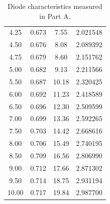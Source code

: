 \documentclass{article}
\begin{document}
\begin{table}[hbtp]
\begin{tabular}{cccc}
    4.25 & 0.673 & 7.55 & 2.021548 \\
    4.50 & 0.676 & 8.08 & 2.089392 \\
    4.75 & 0.679 & 8.60 & 2.151762 \\
    5.00 & 0.682 & 9.13 & 2.211566 \\
    5.50 & 0.687 & 10.18 & 2.320425 \\
    6.00 & 0.692 & 11.23 & 2.418589 \\
    6.50 & 0.696 & 12.30 & 2.509599 \\
    7.00 & 0.699 & 13.36 & 2.592265 \\
    7.50 & 0.703 & 14.42 & 2.668616 \\
    8.00 & 0.706 & 15.49 & 2.740195 \\
    8.50 & 0.709 & 16.56 & 2.806990 \\
    9.00 & 0.712 & 17.66 & 2.871302 \\
    9.50 & 0.714 & 18.75 & 2.931194 \\
    10.00 & 0.717 & 19.84 & 2.987700 \\
  \end{tabular}
  \caption{\label{tab:part_a} Diode characteristics measured in Part A.}
\end{table}
\end{document}
